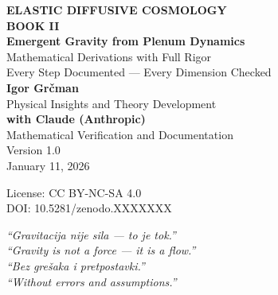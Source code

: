 \documentclass[12pt,a4paper,openany]{book}
\theoremstyle{definition}
\theoremstyle{plain}
\theoremstyle{remark}
\begin{document}
\begin{titlepage}
\centering
\vspace*{2cm}

{\Huge\bfseries\color{edcblue} ELASTIC DIFFUSIVE COSMOLOGY}\\[0.5cm]
{\LARGE\bfseries BOOK II}\\[1cm]
{\huge\bfseries Emergent Gravity from Plenum Dynamics}\\[2cm]

{\Large Mathematical Derivations with Full Rigor}\\[0.5cm]
{\large Every Step Documented — Every Dimension Checked}\\[3cm]

{\Large\textbf{Igor Grčman}}\\[0.3cm]
{\large Physical Insights and Theory Development}\\[1cm]

{\Large\textbf{with Claude (Anthropic)}}\\[0.3cm]
{\large Mathematical Verification and Documentation}\\[3cm]

{\large Version 1.0}\\[0.3cm]
{\large January 11, 2026}\\[2cm]

\vfill

{\small License: CC BY-NC-SA 4.0}\\[0.3cm]
{\small DOI: 10.5281/zenodo.XXXXXXX}

\end{titlepage}

\thispagestyle{empty}
\vspace*{\fill}
\begin{center}
\textit{``Gravitacija nije sila — to je tok.''}\\[0.5cm]
\textit{``Gravity is not a force — it is a flow.''}\\[2cm]

\textit{``Bez grešaka i pretpostavki.''}\\[0.5cm]
\textit{``Without errors and assumptions.''}
\end{center}
\vspace*{\fill}
\clearpage
\end{document}
